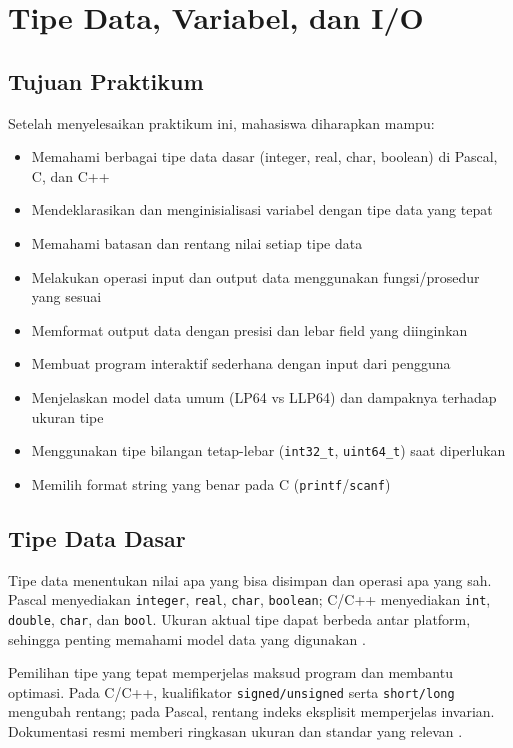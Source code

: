 \documentclass[../main.tex]{subfiles}
\begin{document}
\chapter{Tipe Data, Variabel, dan I/O}

\section*{Tujuan Praktikum}
Setelah menyelesaikan praktikum ini, mahasiswa diharapkan mampu:
\begin{itemize}
  \item Memahami berbagai tipe data dasar (integer, real, char, boolean) di Pascal, C, dan C++
  \item Mendeklarasikan dan menginisialisasi variabel dengan tipe data yang tepat
  \item Memahami batasan dan rentang nilai setiap tipe data
  \item Melakukan operasi input dan output data menggunakan fungsi/prosedur yang sesuai
  \item Memformat output data dengan presisi dan lebar field yang diinginkan
  \item Membuat program interaktif sederhana dengan input dari pengguna
  \item Menjelaskan model data umum (LP64 vs LLP64) dan dampaknya terhadap ukuran tipe
  \item Menggunakan tipe bilangan tetap-lebar (\texttt{int32\_t}, \texttt{uint64\_t}) saat diperlukan \parencite{c-std-integer-types}
  \item Memilih format string yang benar pada C (\texttt{printf}/\texttt{scanf}) \parencite{c-printf,c-scanf}
\end{itemize}

\section{Tipe Data Dasar}
Tipe data menentukan nilai apa yang bisa disimpan dan operasi apa yang sah. Pascal menyediakan \texttt{integer}, \texttt{real}, \texttt{char}, \texttt{boolean}; C/C++ menyediakan \texttt{int}, \texttt{double}, \texttt{char}, dan \texttt{bool}. Ukuran aktual tipe dapat berbeda antar platform, sehingga penting memahami model data yang digunakan \parencite{pascal-tutorial-wikibooks,iso-c-draft-n1570,cpp-arithmetic-types,cpp-fundamental-types}.

Pemilihan tipe yang tepat memperjelas maksud program dan membantu optimasi. Pada C/C++, kualifikator \texttt{signed/unsigned} serta \texttt{short/long} mengubah rentang; pada Pascal, rentang indeks eksplisit memperjelas invarian. Dokumentasi resmi memberi ringkasan ukuran dan standar yang relevan \parencite{free-pascal-docs,iso-c-draft-n1570,cpp-reference}.
\end{document}
